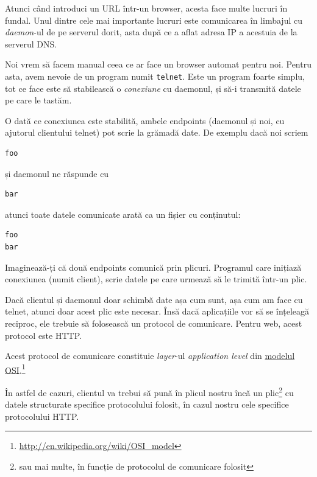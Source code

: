 \vspace{1em}\dotfill\vspace{1em}

Atunci când introduci un URL într-un browser, acesta face multe lucruri în fundal.
Unul dintre cele mai importante lucruri este comunicarea în limbajul
 cu \textit{daemon}-ul de pe serverul dorit,
asta după ce a aflat adresa IP a acestuia de la serverul DNS.

Noi vrem să facem manual ceea ce ar face un browser automat pentru noi. Pentru asta,
avem nevoie de un program numit \texttt{telnet}. Este un program foarte simplu, tot ce
face este să stabilească o \textsl{conexiune} cu daemonul, și să-i transmită datele pe care
le tastăm.

O dată ce conexiunea este stabilită, ambele endpoints (daemonul și noi, cu ajutorul
clientului telnet) pot scrie la grămadă date. De exemplu dacă noi scriem
\begin{verbatim}
foo
\end{verbatim}
și daemonul ne răspunde cu
\begin{verbatim}
bar
\end{verbatim}
atunci toate datele comunicate arată ca un fișier cu conținutul:
\begin{verbatim}
foo
bar
\end{verbatim}

Imaginează-ți că două endpoints comunică prin plicuri.
Programul care inițiază conexiunea (numit client), scrie datele pe
care urmează să le trimită într-un plic.

Dacă clientul și daemonul doar schimbă date {\glqq}așa cum sunt{\grqq},
așa cum am face cu telnet, atunci doar acest plic este necesar.
Însă dacă aplicațiile vor să se înțeleagă reciproc,
ele trebuie să folosească un protocol de comunicare.
Pentru web, acest protocol este HTTP.

Acest protocol de comunicare constituie \textit{layer}-ul \textsl{application level}
din \href{http://en.wikipedia.org/wiki/OSI_model}{modelul OSI}.\footnote{\url{http://en.wikipedia.org/wiki/OSI_model}}

În astfel de cazuri, clientul va trebui să pună în plicul nostru încă
un plic\footnote{sau mai multe, în funcție de protocolul de comunicare folosit}
cu datele structurate specifice protocolului folosit,
în cazul nostru cele specifice protocolului HTTP.

